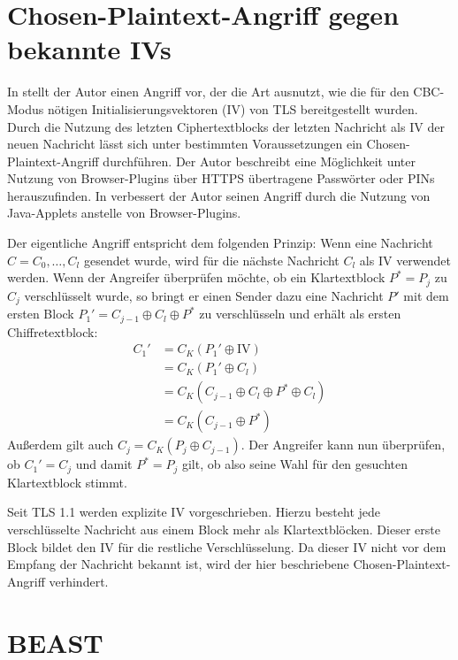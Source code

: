 \section{Chosen-Plaintext-Angriff gegen bekannte IVs}

\label{sec_known_ivs}

In \cite{bard04} stellt der Autor einen Angriff vor, der die Art ausnutzt, wie die für den CBC-Modus nötigen Initialisierungsvektoren (IV) von TLS bereitgestellt wurden. Durch die Nutzung des letzten Ciphertextblocks der letzten Nachricht als IV der neuen Nachricht lässt sich unter bestimmten Voraussetzungen ein Chosen-Plaintext-Angriff durchführen. Der Autor beschreibt eine Möglichkeit unter Nutzung von Browser-Plugins über HTTPS übertragene Passwörter oder PINs herauszufinden. In \cite{bard06} verbessert der Autor seinen Angriff durch die Nutzung von Java-Applets anstelle von Browser-Plugins.

Der eigentliche Angriff entspricht dem folgenden Prinzip: Wenn eine Nachricht \(C = C_0,\dots,C_l\) gesendet wurde, wird für die nächste Nachricht \(C_l\) als IV verwendet werden. Wenn der Angreifer überprüfen möchte, ob ein Klartextblock \(P^*=P_j\) zu \(C_j\) verschlüsselt wurde, so bringt er einen Sender dazu eine Nachricht \(P'\) mit dem ersten Block \(P_1'=C_{j-1} \oplus C_l \oplus P^*\) zu verschlüsseln und erhält als ersten Chiffretextblock:
\begin{align*}
C_1' &= C_{K}(P_1' \oplus \text{IV})\\
	&= C_{K}(P_1' \oplus C_l)\\
	&= C_{K}(C_{j-1} \oplus C_l \oplus P^* \oplus C_l)\\
	&= C_{K}(C_{j-1} \oplus P^*)
\end{align*}
Außerdem gilt auch \(C_j= C_{K}(P_j \oplus C_{j-1})\). Der Angreifer kann nun überprüfen, ob \(C_1'=C_j\) und damit \(P^*=P_j\) gilt, ob also seine Wahl für den gesuchten Klartextblock stimmt.

Seit TLS 1.1 werden explizite IV vorgeschrieben. Hierzu besteht jede verschlüsselte Nachricht aus einem Block mehr als Klartextblöcken. Dieser erste Block bildet den IV für die restliche Verschlüsselung. Da dieser IV nicht vor dem Empfang der Nachricht bekannt ist, wird der hier beschriebene Chosen-Plaintext-Angriff verhindert.

\section{BEAST}

